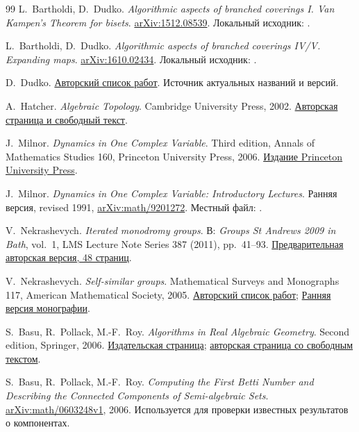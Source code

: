 \begin{thebibliography}{99}
L.~Bartholdi, D.~Dudko. \emph{Algorithmic aspects of branched coverings I.
Van Kampen's Theorem for bisets}.
\href{https://arxiv.org/abs/1512.08539}{arXiv:1512.08539}.
Локальный исходник: .

L.~Bartholdi, D.~Dudko. \emph{Algorithmic aspects of branched coverings
IV/V. Expanding maps}.
\href{https://arxiv.org/abs/1610.02434}{arXiv:1610.02434}.
Локальный исходник: .

D.~Dudko.
\href{https://www.math.stonybrook.edu/~ddudko/Research}{Авторский список работ}.
Источник актуальных названий и версий.

A.~Hatcher. \emph{Algebraic Topology}. Cambridge University Press, 2002.
\href{https://pi.math.cornell.edu/~hatcher/AT/ATpage.html}{Авторская страница и свободный текст}.

J.~Milnor. \emph{Dynamics in One Complex Variable}. Third edition,
Annals of Mathematics Studies 160, Princeton University Press, 2006.
\href{https://www.jstor.org/stable/j.ctt7rnxn}{Издание Princeton University Press}.

J.~Milnor. \emph{Dynamics in One Complex Variable: Introductory Lectures}.
Ранняя версия, revised 1991, \href{https://arxiv.org/abs/math/9201272}{arXiv:math/9201272}.
Местный файл: .

V.~Nekrashevych. \emph{Iterated monodromy groups}.
В: \emph{Groups St Andrews 2009 in Bath}, vol.~1, LMS Lecture Note Series
387 (2011), pp.~41--93.
\href{https://people.tamu.edu/~nekrash/Preprints/img.pdf}{Предварительная авторская версия, 48 страниц}.

V.~Nekrashevych. \emph{Self-similar groups}.
Mathematical Surveys and Monographs 117, American Mathematical Society, 2005.
\href{https://people.tamu.edu/~nekrash/publ.html}{Авторский список работ};
\href{https://www.math.stonybrook.edu/~mlyubich/Archive/Stock/Nekrash.pdf}{Ранняя версия монографии}.

S.~Basu, R.~Pollack, M.-F.~Roy.
\emph{Algorithms in Real Algebraic Geometry}. Second edition, Springer, 2006.
\href{https://link.springer.com/book/10.1007/3-540-33099-2}{Издательская страница};
\href{https://www.math.purdue.edu/~sbasu/}{авторская страница со свободным текстом}.

S.~Basu, R.~Pollack, M.-F.~Roy.
\emph{Computing the First Betti Number and Describing the Connected
Components of Semi-algebraic Sets}.
\href{https://arxiv.org/abs/math/0603248}{arXiv:math/0603248v1}, 2006.
Используется для проверки известных результатов о компонентах.


\end{thebibliography}
